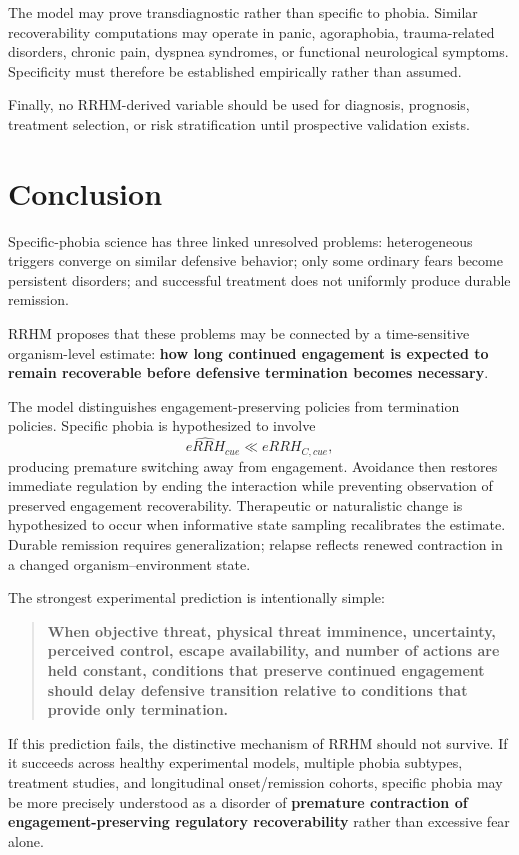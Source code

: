 \documentclass[9pt,twocolumn]{article}
\begin{document}
The model may prove transdiagnostic rather than specific to phobia. Similar recoverability computations may operate in panic, agoraphobia, trauma-related disorders, chronic pain, dyspnea syndromes, or functional neurological symptoms. Specificity must therefore be established empirically rather than assumed.

Finally, no RRHM-derived variable should be used for diagnosis, prognosis, treatment selection, or risk stratification until prospective validation exists.

\section{Conclusion}
Specific-phobia science has three linked unresolved problems: heterogeneous triggers converge on similar defensive behavior; only some ordinary fears become persistent disorders; and successful treatment does not uniformly produce durable remission.

RRHM proposes that these problems may be connected by a time-sensitive organism-level estimate: \textbf{how long continued engagement is expected to remain recoverable before defensive termination becomes necessary}.

The model distinguishes engagement-preserving policies from termination policies. Specific phobia is hypothesized to involve
\[
\widehat{eRRH}_{cue}\ll eRRH_{C,cue},
\]
producing premature switching away from engagement. Avoidance then restores immediate regulation by ending the interaction while preventing observation of preserved engagement recoverability. Therapeutic or naturalistic change is hypothesized to occur when informative state sampling recalibrates the estimate. Durable remission requires generalization; relapse reflects renewed contraction in a changed organism--environment state.

The strongest experimental prediction is intentionally simple:
\begin{quote}
\textbf{When objective threat, physical threat imminence, uncertainty, perceived control, escape availability, and number of actions are held constant, conditions that preserve continued engagement should delay defensive transition relative to conditions that provide only termination.}
\end{quote}

If this prediction fails, the distinctive mechanism of RRHM should not survive. If it succeeds across healthy experimental models, multiple phobia subtypes, treatment studies, and longitudinal onset/remission cohorts, specific phobia may be more precisely understood as a disorder of \textbf{premature contraction of engagement-preserving regulatory recoverability} rather than excessive fear alone.
\end{document}
